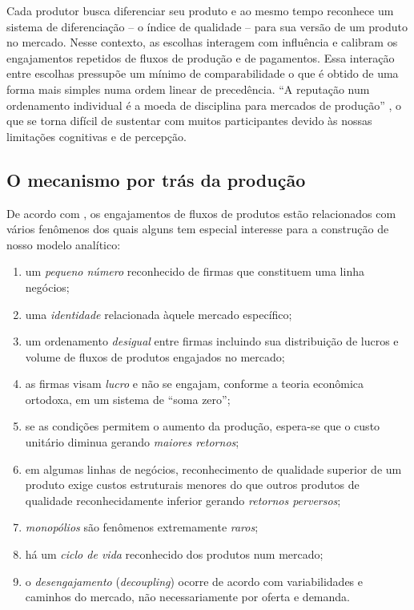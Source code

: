 \documentclass[a4paper, 12pt, openright, oneside, german, french, english, brazil]{abntex2}
\begin{document}
	Cada produtor busca diferenciar seu produto e ao mesmo tempo reconhece um sistema de diferenciação  -- o índice de qualidade -- para sua versão de um produto no mercado. Nesse contexto, as escolhas interagem com influência e calibram os engajamentos repetidos de fluxos de produção e de pagamentos. Essa interação entre escolhas pressupõe um mínimo de comparabilidade o que é obtido de uma forma mais simples numa ordem linear de precedência. ``A reputação num ordenamento individual é a moeda de disciplina para mercados de produção'' \cite[p. 10]{white2002markets}, o que se torna difícil de sustentar com muitos participantes devido às nossas limitações cognitivas e de percepção.


	\subsection{O mecanismo por trás da produção}

	
	
	De acordo com , os engajamentos de fluxos de produtos estão relacionados com vários fenômenos dos quais alguns tem especial interesse para a construção de nosso modelo analítico:

	\begin{enumerate}
		\item um \textit{pequeno número} reconhecido de firmas que constituem uma linha negócios;
		\item uma \textit{identidade} relacionada àquele mercado específico;
		\item um ordenamento \textit{desigual} entre firmas incluindo sua distribuição de lucros e volume de fluxos de produtos engajados no mercado;
		\item as firmas visam \textit{lucro} e não se engajam, conforme a teoria econômica ortodoxa, em um sistema de ``soma zero'';
		\item se as condições permitem o aumento da produção, espera-se que o custo unitário diminua gerando \textit{maiores retornos};
		\item em algumas linhas de negócios, reconhecimento de qualidade superior de um produto exige custos estruturais menores do que outros produtos de qualidade reconhecidamente inferior gerando \textit{retornos perversos};
		\item \textit{monopólios} são fenômenos extremamente \textit{raros};
		\item há um \textit{ciclo de vida} reconhecido dos produtos num mercado;
		\item o \textit{desengajamento} (\textit{decoupling}) ocorre de acordo com variabilidades e caminhos do mercado, não necessariamente por oferta e demanda.
	\end{enumerate}
\end{document}
